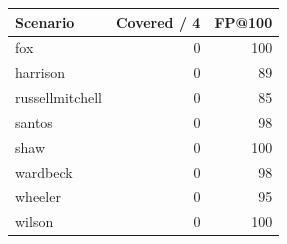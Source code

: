 \begin{tabular}{lrr}
\toprule
Scenario & Covered / 4 & FP@100 \\
\midrule
fox & 0 & 100 \\
harrison & 0 & 89 \\
russellmitchell & 0 & 85 \\
santos & 0 & 98 \\
shaw & 0 & 100 \\
wardbeck & 0 & 98 \\
wheeler & 0 & 95 \\
wilson & 0 & 100 \\
\bottomrule
\end{tabular}
